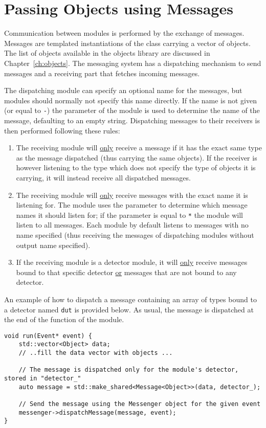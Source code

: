 \section{Passing Objects using Messages}
\label{sec:objects_messages}
Communication between modules is performed by the exchange of messages.
Messages are templated instantiations of the  class carrying a vector of objects.
The list of objects available in the \apsq objects library are discussed in Chapter~\ref{ch:objects}.
The messaging system has a dispatching mechanism to send messages and a receiving part that fetches incoming messages.

The dispatching module can specify an optional name for the messages, but modules should normally not specify this name directly.
If the name is not given (or equal to \texttt{-}) the  parameter of the module is used to determine the name of the message, defaulting to an empty string.
Dispatching messages to their receivers is then performed following these rules:
\begin{enumerate}
    \item The receiving module will \underline{only} receive a message if it has the exact same type as the message dispatched (thus carrying the same objects).
    If the receiver is however listening to the  type which does not specify the type of objects it is carrying, it will instead receive all dispatched messages.
    \item The receiving module will \underline{only} receive messages with the exact name it is listening for.
    The module uses the  parameter to determine which message names it should listen for; if the  parameter is equal to \texttt{*} the module will listen to all messages.
    Each module by default listens to messages with no name specified (thus receiving the messages of dispatching modules without output name specified).
    \item If the receiving module is a detector module, it will \underline{only} receive messages bound to that specific detector \underline{or} messages that are not bound to any detector.
\end{enumerate}

An example of how to dispatch a message containing an array of  types bound to a detector named \texttt{dut} is provided below.
As usual, the message is dispatched at the end of the  function of the module.
\begin{verbatim}
void run(Event* event) {
    std::vector<Object> data;
    // ..fill the data vector with objects ...

    // The message is dispatched only for the module's detector, stored in "detector_"
    auto message = std::make_shared<Message<Object>>(data, detector_);

    // Send the message using the Messenger object for the given event
    messenger->dispatchMessage(message, event);
}
\end{verbatim}

